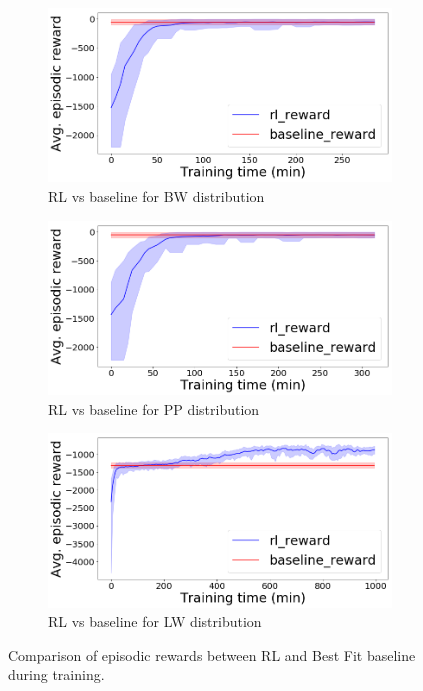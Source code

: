 \documentclass[letterpaper]{article} %
\begin{document}
\begin{figure}
	\centering
	\begin{subfigure}[b]{0.33\textwidth}
		\centering
		\includegraphics[width=\textwidth]{images/bin_packing_rl_vs_baseline_bounded_waste_binsize_100.png}
		\caption{RL vs baseline for BW distribution}
		\label{fig:bin_packing_BW_dist1}
	\end{subfigure}
	\hfill
	\begin{subfigure}[b]{0.33\textwidth}
		\centering
		\includegraphics[width=\textwidth]{images/bin_packing_rl_vs_baseline_perfect_pack_binsize_100.png}
		\caption{RL vs baseline for PP distribution}
		\label{fig:bin_packing_PP_dist1}
	\end{subfigure}
	\hfill
	\begin{subfigure}[b]{0.33\textwidth}
		\centering
		\includegraphics[width=\textwidth]{images/bin_packing_rl_vs_baseline_linear_waste_binsize_100.png}
		\caption{RL vs baseline for LW distribution}
		\label{fig:bin_packing_LW_dist1}
	\end{subfigure}
	\caption{Comparison of episodic rewards between RL and Best Fit baseline during training.}
	\label{fig:RLvsBF_binpacking}
\end{figure}
\end{document}
